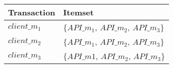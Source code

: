 \begin{tabular}{ll}
\toprule
\textsf{Transaction} & \textsf{Itemset}\\
\midrule
%
\textsf{$client\_m_1$} & \textsf{$\{API\_m_1$, $API\_m_2$, $API\_m_3\}$} \\
%
\textsf{$client\_m_2$} & \textsf{$\{API\_m_1$, $API\_m_2$, $API\_m_3\}$} \\
\textsf{$client\_m_3$} & \textsf{$\{API\_m1$, $API\_m_2$, $API\_m_3\}$} \\
\bottomrule
\end{tabular}